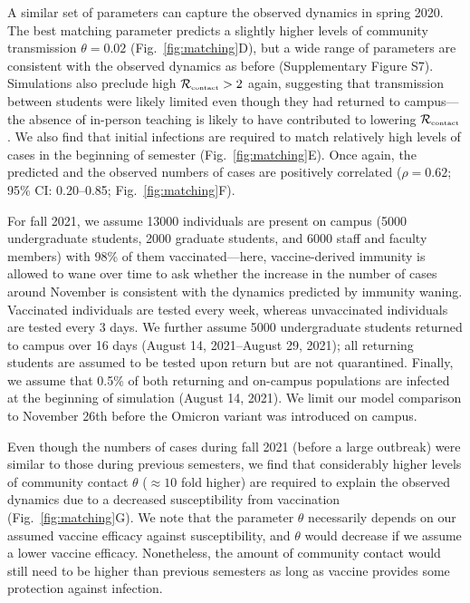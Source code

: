\documentclass[12pt]{article}
\newcommand{\fref}[1]{Fig.~\ref{fig:#1}}
\newcommand{\Rx}[1]{\ensuremath{{\mathcal R}_{#1}}}
\newcommand{\Rc}{\Rx{\textrm{\tiny{contact}}}}
\begin{document}
A similar set of parameters can capture the observed dynamics in spring 2020.
The best matching parameter predicts a slightly higher levels of community transmission $\theta=0.02$ (\fref{matching}D), but a wide range of parameters are consistent with the observed dynamics as before (Supplementary Figure S7). 
Simulations also preclude high $\Rc > 2$ again, suggesting that transmission between students were likely limited even though they had returned to campus---the absence of in-person teaching is likely to have contributed to lowering $\Rc$.
We also find that initial infections are required to match relatively high levels of cases in the beginning of semester (\fref{matching}E). 
Once again, the predicted and the observed numbers of cases are positively correlated ($\rho = 0.62$; 95\% CI: 0.20--0.85; \fref{matching}F).

For fall 2021, we assume 13000 individuals are present on campus (5000 undergraduate students, 2000 graduate students, and 6000 staff and faculty members) with 98\% of them vaccinated---here, vaccine-derived immunity is allowed to wane over time to ask whether the increase in the number of cases around November is consistent with the dynamics predicted by immunity waning.
Vaccinated individuals are tested every week, whereas unvaccinated individuals are tested every 3 days. 
We further assume 5000 undergraduate students returned to campus over 16 days (August 14, 2021--August 29, 2021);
all returning students are assumed to be tested upon return but are not quarantined.
Finally, we assume that 0.5\% of both returning and on-campus populations are infected at the beginning of simulation (August 14, 2021).
We limit our model comparison to November 26th before the Omicron variant was introduced on campus.

Even though the numbers of cases during fall 2021 (before a large outbreak) were similar to those during previous semesters, we find that considerably higher levels of community contact $\theta$ ($\approx 10$ fold higher) are required to explain the observed dynamics due to a decreased susceptibility from vaccination (\fref{matching}G).
We note that the parameter $\theta$ necessarily depends on our assumed vaccine efficacy against susceptibility, and $\theta$ would decrease if we assume a lower vaccine efficacy.
Nonetheless, the amount of community contact would still need to be higher than previous semesters as long as vaccine provides some protection against infection.
\end{document}
